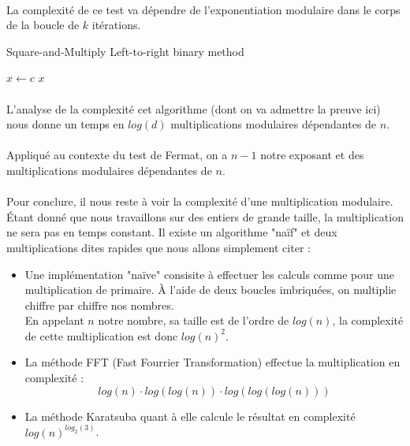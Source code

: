 		\paragraph{}La complexité de ce test va dépendre de l'exponentiation modulaire dans le corps de la boucle de $k$ itérations.\\
		\begin{algorithm}[H]
			\caption{Square-and-Multiply Left-to-right binary method}\label{SqM}
			$x \gets c$\;
		\Retour $x$\;
		\end{algorithm}
		\paragraph{}L'analyse de la complexité cet algorithme (dont on va admettre la preuve ici) nous donne un temps en $log(d)$ multiplications modulaires dépendantes de $n$.
		\paragraph{}Appliqué au contexte du test de Fermat, on a $n-1$ notre exposant et des multiplications modulaires dépendantes de $n$.
		\paragraph{}Pour conclure, il nous reste à voir la complexité d'une multiplication modulaire. Étant donné que nous travaillons sur des entiers de grande taille, la multiplication ne sera pas en temps constant. Il existe un algorithme "naïf" et deux multiplications dites rapides que nous allons simplement citer :
			\begin{itemize}
			\item
			Une implémentation "naïve" consisite à effectuer les calculs comme pour une multiplication de primaire. À l'aide de deux boucles imbriquées, on multiplie chiffre par chiffre nos nombres.\\
			En appelant $n$ notre nombre, sa taille est de l'ordre de $log(n)$, la complexité de cette multiplication est donc $log(n)^{2}$.
			\item
			La méthode FFT (Fast Fourrier Transformation) effectue la multiplication en complexité :$$log(n) \cdot log(log(n)) \cdot log(log(log(n)))$$
			\item
			La méthode Karatsuba quant à elle calcule le résultat en complexité $log(n)^{log_{2}(3)}$.
			\end{itemize}
